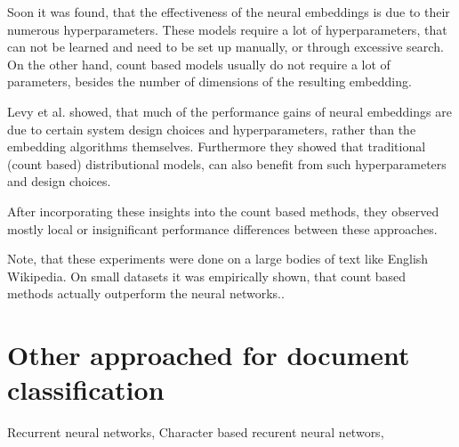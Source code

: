     Soon it was found, that the effectiveness of the neural embeddings is due to their numerous hyperparameters.
    These models require a lot of hyperparameters, that can not be learned and need to be set up manually,
    or through excessive search.
    On the other hand, count based models usually do not require a lot of parameters, besides the number of dimensions of the resulting embedding. 
    
    Levy et al. \cite{levy2015improving} %
    showed, that much  of  the  performance  gains  of  neural embeddings  are  due  to  certain  system design  choices and hyperparameters, rather than the embedding algorithms themselves. 
    Furthermore they showed that traditional (count based) distributional models, 
    can also benefit from such hyperparameters and design choices.
    
    After incorporating these insights into the count based methods, 
    they observed mostly local or insignificant performance differences between these approaches.
    
    Note, that these experiments were done on a large bodies of text like English Wikipedia.   
    On small datasets it was empirically shown, that count based methods actually outperform the neural networks.\cite{altszyler2016comparative}. %
    
    \* \cite{naili2017comparative} %

\section{Other approached for document classification}
    
    Recurrent neural networks,
    Character based recurent neural networs, 

\* %